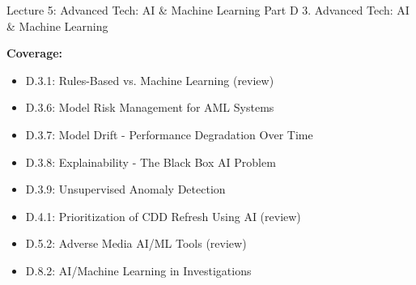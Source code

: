 \documentclass[11pt,a4paper]{beamer}
\begin{document}
\begin{frame}{Lecture 5: Advanced Tech: AI \& Machine Learning}
	\centering
	\Large Part D 3. Advanced Tech: AI \& Machine Learning
	\vspace{0.5cm}
	
	\textbf{Coverage:}
	\begin{itemize}
		\item D.3.1: Rules-Based vs. Machine Learning (review)
		\item D.3.6: Model Risk Management for AML Systems
		\item D.3.7: Model Drift - Performance Degradation Over Time
		\item D.3.8: Explainability - The Black Box AI Problem
		\item D.3.9: Unsupervised Anomaly Detection
		\item D.4.1: Prioritization of CDD Refresh Using AI (review)
		\item D.5.2: Adverse Media AI/ML Tools (review)
		\item D.8.2: AI/Machine Learning in Investigations
	\end{itemize}
\end{frame}
\end{document}
